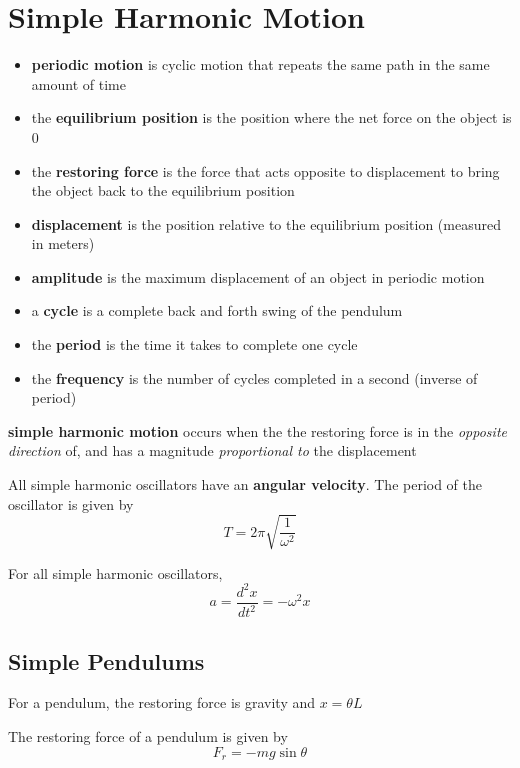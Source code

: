 \documentclass[titlepage]{article}
\begin{document}
\section{Simple Harmonic Motion}
\begin{itemize}
    \item \textbf{periodic motion} is cyclic motion that repeats the same path in the same amount of time
    \item the \textbf{equilibrium position} is the position where the net force on the object is 0
    \item the \textbf{restoring force} is the force that acts opposite to displacement to bring the object back to the equilibrium position
    \item \textbf{displacement} is the position relative to the equilibrium position (measured in meters)
    \item \textbf{amplitude} is the maximum displacement of an object in periodic motion
    \item a \textbf{cycle} is a complete back and forth swing of the pendulum
    \item the \textbf{period} is the time it takes to complete one cycle
    \item the \textbf{frequency} is the number of cycles completed in a second (inverse of period)
\end{itemize}

\textbf{simple harmonic motion} occurs when the the restoring force is in the \emph{opposite direction} of, and has a magnitude \emph{proportional to} the displacement

All simple harmonic oscillators have an \textbf{angular velocity}. The period of the oscillator is given by
\begin{equation*}
    T = 2 \pi \sqrt{\frac{1}{\omega ^ 2}}
\end{equation*}

For all simple harmonic oscillators, 
\begin{equation*}
    a = \frac{d^2 x}{dt^2} = - \omega^2 x
\end{equation*}

\subsection{Simple Pendulums}
For a pendulum, the restoring force is gravity and $x = \theta L$

The restoring force of a pendulum is given by
\begin{equation*}
    F_{r} = -mg \sin \theta
\end{equation*}
\end{document}
